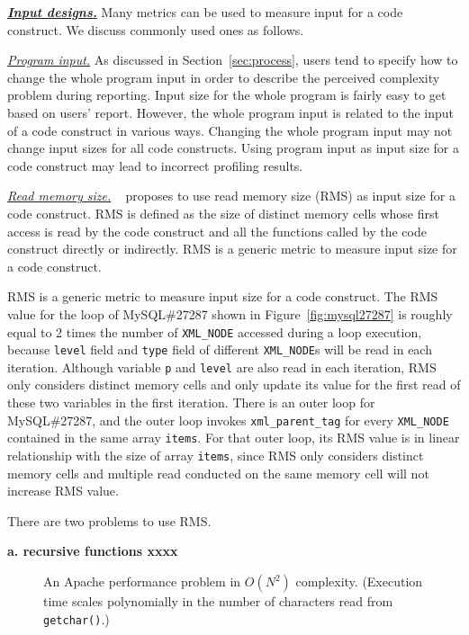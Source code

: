 {{\bf{\underline{\textit{Input designs.}}}}
Many metrics can be used to measure input for a code construct. 
We discuss commonly used ones as follows.



\underline{\textit{Program input.}}
As discussed in Section~\ref{sec:process}, 
users tend to specify how to change the whole program 
input in order to describe the perceived complexity problem during reporting.
Input size for the whole program is fairly easy to get based on users' report.
However, the whole program input is related to the input of a code construct in various ways.  
Changing the whole program input may not change 
input sizes for all code constructs.
Using program input as input size for a code 
construct may lead to incorrect profiling results.


\underline{\textit{Read memory size.}}
~\citet{Aprof1,Aprof2} proposes to use read memory size (RMS) as
input size for a code construct. 
RMS is defined as the size of distinct memory cells 
whose first access is read by the code construct and 
all the functions called by the code construct directly or indirectly.  
RMS is a generic metric to measure input size for a code construct. 

RMS is a generic metric to measure input size for a code construct. 
The RMS value for the loop of MySQL\#27287 shown in Figure~\ref{fig:mysql27287}
is roughly equal to 2 times the number of \texttt{XML\_NODE} 
accessed during a loop execution, 
because \texttt{level} field and \texttt{type} field of 
different \texttt{XML\_NODE}s will be read in each iteration.
Although variable \texttt{p} and \texttt{level} are also read in each iteration,
RMS only considers distinct memory cells and 
only update its value for the first read of these two variables in the first iteration.  
There is an outer loop for MySQL\#27287, 
and the outer loop invokes \texttt{xml\_parent\_tag} 
for every \texttt{XML\_NODE} contained
in the same array \texttt{items}. 
For that outer loop, its RMS value is in linear relationship 
with the size of array  \texttt{items}, 
since RMS only considers distinct memory cells 
and multiple read conducted on the same memory 
cell will not increase RMS value. 

There are two problems to use RMS. 

{\bf a. recursive functions xxxx}

\begin{figure}
\centering
{}
  \mbox{}
\caption{An Apache performance problem in $O(N^2)$ complexity. 
(Execution time scales polynomially in the number of characters read from  \texttt{getchar()}.) }
\vspace{-0.05in}
\label{fig:apache34464}
\vspace{-0.05in}
\end{figure}

}
